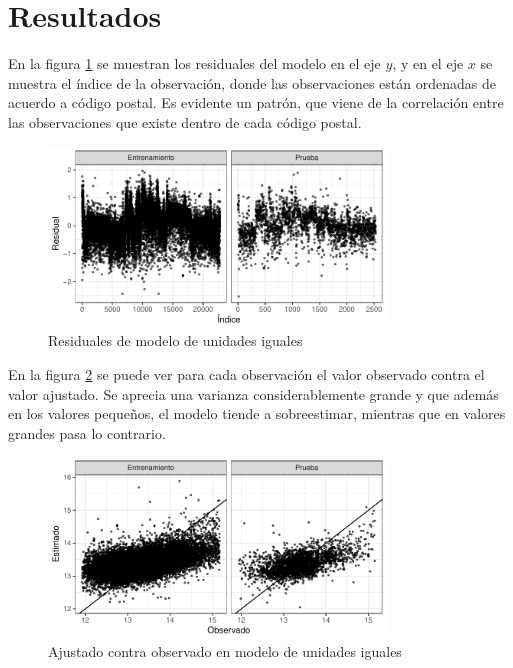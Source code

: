 
\section{Resultados}
\label{sec:resultados}

En la figura \ref{fig:comp_pooling_resids} se muestran los residuales del modelo en el eje $y$, y en el eje $x$ se muestra el índice de la observación, donde las observaciones están ordenadas de acuerdo a código postal. Es evidente un patrón, que viene de la correlación entre las observaciones que existe dentro de cada código postal.

\begin{figure}[H]
    \centering
    \includegraphics[width=0.8\textwidth]{images/comp_pooling_resids.pdf}
    \caption{Residuales de modelo de unidades iguales}
    \label{fig:comp_pooling_resids}
\end{figure}

En la figura \ref{fig:comp_pooling_obs_vs_pred} se puede ver para cada observación el valor observado contra el valor ajustado. Se aprecia una varianza considerablemente grande y que además en los valores pequeños, el modelo tiende a sobreestimar, mientras que en valores grandes pasa lo contrario.

\begin{figure}[H]
    \centering
    \includegraphics[width=0.8\textwidth]{images/comp_pooling_obs_vs_pred.pdf}
    \caption{Ajustado contra observado en modelo de unidades iguales}
    \label{fig:comp_pooling_obs_vs_pred}
\end{figure}


